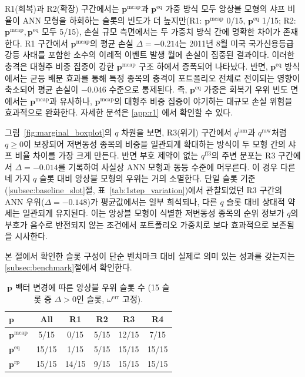 \documentclass{article}
\begin{document}
R1(회복)과 R2(확장) 구간에서는 $\mathbf{p}^{\mathrm{mcap}}$과 $\mathbf{p}^{\mathrm{eq}}$ 가중 방식 모두 앙상블 모형의 샤프 비율이 ANN 모형을 하회하는 슬롯의 빈도가 더 높지만(R1: $\mathbf{p}^{\mathrm{mcap}}$ 0/15, $\mathbf{p}^{\mathrm{eq}}$ 1/15; R2: $\mathbf{p}^{\mathrm{mcap}}, \mathbf{p}^{\mathrm{eq}}$ 모두 5/15), 손실 규모 측면에서는 두 가중치 방식 간에 명확한 차이가 존재한다. R1 구간에서 $\mathbf{p}^{\mathrm{mcap}}$의 평균 손실 $\Delta = -0.214$는 2011년 8월 미국 국가신용등급 강등 사태를 포함한 소수의 이례적 이벤트 발생 월에 손실이 집중된 결과이다. 이러한 충격은 대형주 비중 집중이 강한 $\mathbf{p}^{\mathrm{mcap}}$ 구조 하에서 증폭되어 나타났다. 반면, $\mathbf{p}^{\mathrm{eq}}$ 방식에서는 균등 배분 효과를 통해 특정 종목의 충격이 포트폴리오 전체로 전이되는 영향이 축소되어 평균 손실이 $-0.046$ 수준으로 통제된다. 즉, $\mathbf{p}^{\mathrm{eq}}$ 가중은 회복기 우위 빈도 면에서는 $\mathbf{p}^{\mathrm{mcap}}$과 유사하나, $\mathbf{p}^{\mathrm{mcap}}$의 대형주 비중 집중이 야기하는 대규모 손실 위험을 효과적으로 완화한다. 자세한 분석은 \ref{app:r1} 에서 확인할 수 있다.

그림~\ref{fig:marginal_boxplot}의 $q$ 차원을 보면, R3(위기) 구간에서 $q^{\mathrm{lam}}$과 $q^{\mathrm{raw}}$처럼 $q \geq 0$이 보장되어 저변동성 종목의 비중을 일관되게 확대하는 방식이 두 모형 간의 샤프 비율 차이를 가장 크게 만든다. 
반면 부호 제약이 없는 $q^{\mathrm{ff3}}$의 주변 분포는 R3 구간에서 $\Delta = -0.014$를 기록하여 사실상 ANN 모형과 동등 수준에 머무른다. 이 경우 다른 네 가지 $q$ 슬롯 대비 앙상블 모형의 우위는 거의 소멸한다. 단일 슬롯 기준 (\ref{subsec:baseline_slot}절, 표~\ref{tab:1step_variation})에서 관찰되었던 R3 구간의 ANN 우위($\Delta = -0.148$)가 평균값에서는 일부 희석되나, 다른 $q$ 슬롯 대비 상대적 약세는 일관되게 유지된다. 이는 앙상블 모형이 식별한 저변동성 종목의 순위 정보가 $q$의 부호가 음수로 반전되지 않는 조건에서 포트폴리오 가중치로 보다 효과적으로 보존됨을 시사한다.

본 절에서 확인한 슬롯 구성이 단순 벤치마크 대비 실제로 의미 있는 성과를 갖는지는 \ref{subsec:benchmark}절에서 확인한다.

\begin{table}[ht]
\centering
\caption{$\mathbf{p}$ 벡터 변경에 따른 앙상블 우위 슬롯 수 (15 슬롯 중 $\Delta > 0$인 슬롯, $\omega^{\mathrm{err}}$ 고정).}
\label{tab:p_matrix_win}
\centering
\renewcommand{\arraystretch}{1.15}
\begin{tabular}{l ccccc}
\toprule
$\mathbf{p}$ & All & R1 & R2 & R3 & R4 \\
\midrule
$\mathbf{p}^{\mathrm{mcap}}$ & 5/15  & \cellcolor{negred!50}0/15  & 5/15 & \cellcolor{posgreen!50}12/15 & 7/15 \\
$\mathbf{p}^{\mathrm{eq}}$   & \cellcolor{posgreen!50}15/15 & \cellcolor{negred!50}1/15  & 5/15 & \cellcolor{posgreen!50}15/15 & \cellcolor{posgreen!50}15/15 \\
$\mathbf{p}^{\mathrm{rp}}$   & \cellcolor{posgreen!50}15/15 & \cellcolor{posgreen!50}14/15 & 9/15 & \cellcolor{posgreen!50}15/15 & \cellcolor{posgreen!50}15/15 \\
\bottomrule
\end{tabular}
\end{table}
\end{document}
